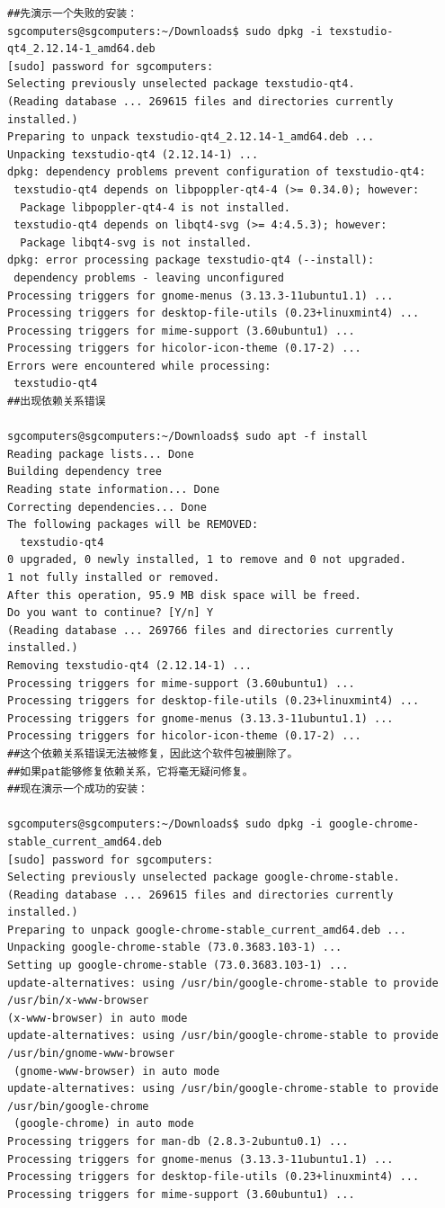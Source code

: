 \documentclass{book}
\begin{document}
\begin{verbatim}
##先演示一个失败的安装：
sgcomputers@sgcomputers:~/Downloads$ sudo dpkg -i texstudio-qt4_2.12.14-1_amd64.deb
[sudo] password for sgcomputers: 
Selecting previously unselected package texstudio-qt4.
(Reading database ... 269615 files and directories currently installed.)
Preparing to unpack texstudio-qt4_2.12.14-1_amd64.deb ...
Unpacking texstudio-qt4 (2.12.14-1) ...
dpkg: dependency problems prevent configuration of texstudio-qt4:
 texstudio-qt4 depends on libpoppler-qt4-4 (>= 0.34.0); however:
  Package libpoppler-qt4-4 is not installed.
 texstudio-qt4 depends on libqt4-svg (>= 4:4.5.3); however:
  Package libqt4-svg is not installed.
dpkg: error processing package texstudio-qt4 (--install):
 dependency problems - leaving unconfigured
Processing triggers for gnome-menus (3.13.3-11ubuntu1.1) ...
Processing triggers for desktop-file-utils (0.23+linuxmint4) ...
Processing triggers for mime-support (3.60ubuntu1) ...
Processing triggers for hicolor-icon-theme (0.17-2) ...
Errors were encountered while processing:
 texstudio-qt4
##出现依赖关系错误

sgcomputers@sgcomputers:~/Downloads$ sudo apt -f install
Reading package lists... Done
Building dependency tree       
Reading state information... Done
Correcting dependencies... Done
The following packages will be REMOVED:
  texstudio-qt4
0 upgraded, 0 newly installed, 1 to remove and 0 not upgraded.
1 not fully installed or removed.
After this operation, 95.9 MB disk space will be freed.
Do you want to continue? [Y/n] Y
(Reading database ... 269766 files and directories currently installed.)
Removing texstudio-qt4 (2.12.14-1) ...
Processing triggers for mime-support (3.60ubuntu1) ...
Processing triggers for desktop-file-utils (0.23+linuxmint4) ...
Processing triggers for gnome-menus (3.13.3-11ubuntu1.1) ...
Processing triggers for hicolor-icon-theme (0.17-2) ...
##这个依赖关系错误无法被修复，因此这个软件包被删除了。
##如果pat能够修复依赖关系，它将毫无疑问修复。
##现在演示一个成功的安装：

sgcomputers@sgcomputers:~/Downloads$ sudo dpkg -i google-chrome-stable_current_amd64.deb
[sudo] password for sgcomputers: 
Selecting previously unselected package google-chrome-stable.
(Reading database ... 269615 files and directories currently installed.)
Preparing to unpack google-chrome-stable_current_amd64.deb ...
Unpacking google-chrome-stable (73.0.3683.103-1) ...
Setting up google-chrome-stable (73.0.3683.103-1) ...
update-alternatives: using /usr/bin/google-chrome-stable to provide /usr/bin/x-www-browser 
(x-www-browser) in auto mode
update-alternatives: using /usr/bin/google-chrome-stable to provide /usr/bin/gnome-www-browser
 (gnome-www-browser) in auto mode
update-alternatives: using /usr/bin/google-chrome-stable to provide /usr/bin/google-chrome
 (google-chrome) in auto mode
Processing triggers for man-db (2.8.3-2ubuntu0.1) ...
Processing triggers for gnome-menus (3.13.3-11ubuntu1.1) ...
Processing triggers for desktop-file-utils (0.23+linuxmint4) ...
Processing triggers for mime-support (3.60ubuntu1) ...

\end{verbatim}
\end{document}
